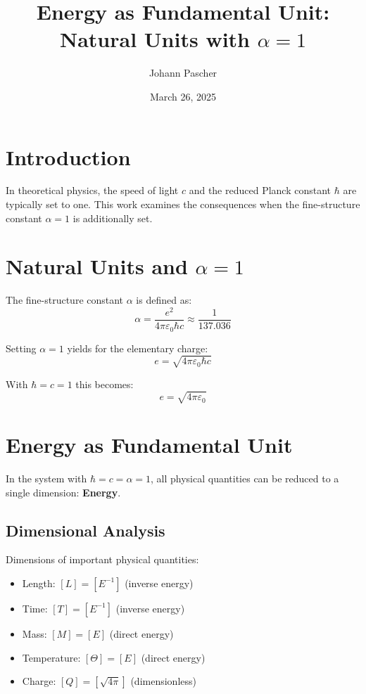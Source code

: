 \documentclass{article}
\title{Energy as Fundamental Unit:\\
	Natural Units with $\alpha = 1$}
\author{Johann Pascher}
\date{March 26, 2025}
\begin{document}
	
	\maketitle
	\tableofcontents
	\section{Introduction}
	In theoretical physics, the speed of light $c$ and the reduced Planck constant $\hbar$ are typically set to one. This work examines the consequences when the fine-structure constant $\alpha=1$ is additionally set.
	
	\section{Natural Units and $\alpha = 1$}
	
	The fine-structure constant $\alpha$ is defined as:
	\begin{equation}
		\alpha = \frac{e^2}{4\pi\varepsilon_0 \hbar c} \approx \frac{1}{137.036}
	\end{equation}
	
	Setting $\alpha = 1$ yields for the elementary charge:
	\begin{equation}
		e = \sqrt{4\pi\varepsilon_0 \hbar c}
	\end{equation}
	
	With $\hbar = c = 1$ this becomes:
	\begin{equation}
		e = \sqrt{4\pi\varepsilon_0}
	\end{equation}
	
	\section{Energy as Fundamental Unit}
	
	In the system with $\hbar = c = \alpha = 1$, all physical quantities can be reduced to a single dimension: \textbf{Energy}.
	
	\subsection{Dimensional Analysis}
	
	Dimensions of important physical quantities:
	
	\begin{itemize}
		\item Length: $[L] = [E^{-1}]$ (inverse energy)
		\item Time: $[T] = [E^{-1}]$ (inverse energy)
		\item Mass: $[M] = [E]$ (direct energy)
		\item Temperature: $[\Theta] = [E]$ (direct energy)
		\item Charge: $[Q] = [\sqrt{4\pi}]$ (dimensionless)
	\end{itemize}
	
\end{document}
